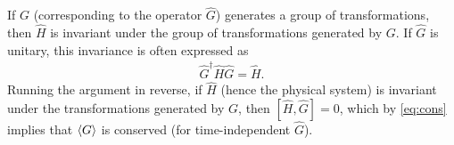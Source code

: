     If $G$ (corresponding to the operator $\hat{G}$) generates a group of transformations, then $\hat{H}$ is invariant under the group of transformations generated by $G$. If $\hat{G}$ is unitary, this invariance is often expressed as 
    \begin{align}
        \hat{G}^\dagger\hat{H}\hat{G} = \hat{H}.
    \end{align}
    Running the argument in reverse, if $\hat{H}$ (hence the physical system) is invariant under the transformations generated by $G$, then $[\hat{H},\hat{G}]=0$, which by \cref{eq:cons} implies that $\braket{G}$ is conserved (for time-independent $\hat{G}$).


